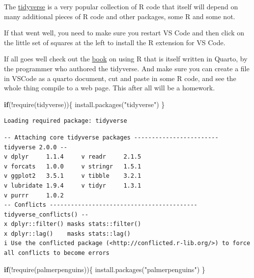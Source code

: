 \documentclass[
  letterpaper,
  DIV=11,
  numbers=noendperiod]{scrreprt}
\newenvironment{Shaded}{\begin{snugshade}}{\end{snugshade}}
\newcommand{\ControlFlowTok}[1]{\textcolor[rgb]{0.00,0.23,0.31}{\textbf{#1}}}
\newcommand{\FunctionTok}[1]{\textcolor[rgb]{0.28,0.35,0.67}{#1}}
\newcommand{\NormalTok}[1]{\textcolor[rgb]{0.00,0.23,0.31}{#1}}
\newcommand{\SpecialCharTok}[1]{\textcolor[rgb]{0.37,0.37,0.37}{#1}}
\newcommand{\StringTok}[1]{\textcolor[rgb]{0.13,0.47,0.30}{#1}}
\begin{document}
The \href{https://www.tidyverse.org/}{tidyverse} is a very popular
collection of R code that itself will depend on many additional pieces
of R code and other packages, some R and some not.

If that went well, you need to make sure you restart VS Code and then
click on the little set of squares at the left to install the R
extension for VS Code.

If all goes well check out the \href{https://r4ds.hadley.nz/}{book} on
using R that is itself written in Quarto, by the programmer who authored
the tidyverse. And make sure you can create a file in VSCode as a quarto
document, cut and paste in some R code, and see the whole thing compile
to a web page. This after all will be a homework.

\begin{Shaded}
\begin{Highlighting}[]
\ControlFlowTok{if}\NormalTok{(}\SpecialCharTok{!}\FunctionTok{require}\NormalTok{(tidyverse))\{}
    \FunctionTok{install.packages}\NormalTok{(}\StringTok{"tidyverse"}\NormalTok{)}
\NormalTok{\}}
\end{Highlighting}
\end{Shaded}

\begin{verbatim}
Loading required package: tidyverse
\end{verbatim}

\begin{verbatim}
-- Attaching core tidyverse packages ------------------------ tidyverse 2.0.0 --
v dplyr     1.1.4     v readr     2.1.5
v forcats   1.0.0     v stringr   1.5.1
v ggplot2   3.5.1     v tibble    3.2.1
v lubridate 1.9.4     v tidyr     1.3.1
v purrr     1.0.2     
-- Conflicts ------------------------------------------ tidyverse_conflicts() --
x dplyr::filter() masks stats::filter()
x dplyr::lag()    masks stats::lag()
i Use the conflicted package (<http://conflicted.r-lib.org/>) to force all conflicts to become errors
\end{verbatim}

\begin{Shaded}
\begin{Highlighting}[]
\ControlFlowTok{if}\NormalTok{(}\SpecialCharTok{!}\FunctionTok{require}\NormalTok{(palmerpenguins))\{}
    \FunctionTok{install.packages}\NormalTok{(}\StringTok{"palmerpenguins"}\NormalTok{)}
\NormalTok{\}}
\end{Highlighting}
\end{Shaded}
\end{document}
